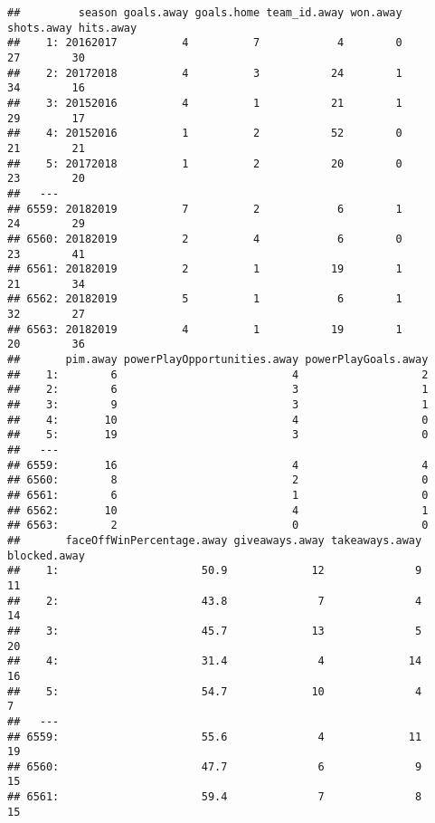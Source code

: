 \documentclass[
]{article}
\begin{document}
\begin{verbatim}
##         season goals.away goals.home team_id.away won.away shots.away hits.away
##    1: 20162017          4          7            4        0         27        30
##    2: 20172018          4          3           24        1         34        16
##    3: 20152016          4          1           21        1         29        17
##    4: 20152016          1          2           52        0         21        21
##    5: 20172018          1          2           20        0         23        20
##   ---                                                                          
## 6559: 20182019          7          2            6        1         24        29
## 6560: 20182019          2          4            6        0         23        41
## 6561: 20182019          2          1           19        1         21        34
## 6562: 20182019          5          1            6        1         32        27
## 6563: 20182019          4          1           19        1         20        36
##       pim.away powerPlayOpportunities.away powerPlayGoals.away
##    1:        6                           4                   2
##    2:        6                           3                   1
##    3:        9                           3                   1
##    4:       10                           4                   0
##    5:       19                           3                   0
##   ---                                                         
## 6559:       16                           4                   4
## 6560:        8                           2                   0
## 6561:        6                           1                   0
## 6562:       10                           4                   1
## 6563:        2                           0                   0
##       faceOffWinPercentage.away giveaways.away takeaways.away blocked.away
##    1:                      50.9             12              9           11
##    2:                      43.8              7              4           14
##    3:                      45.7             13              5           20
##    4:                      31.4              4             14           16
##    5:                      54.7             10              4            7
##   ---                                                                     
## 6559:                      55.6              4             11           19
## 6560:                      47.7              6              9           15
## 6561:                      59.4              7              8           15

\end{verbatim}
\end{document}
